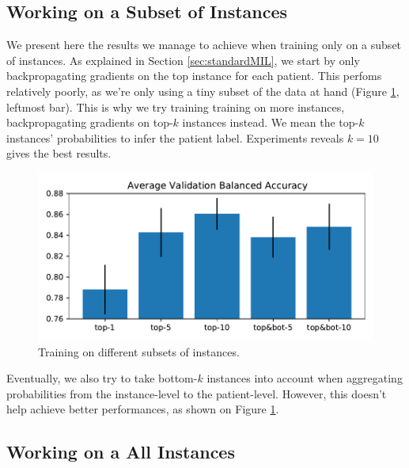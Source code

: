 \documentclass[final]{cvpr}
\begin{document}
	\subsection{Working on a Subset of Instances}
	\label{sec:topk_results}
	
	We present here the results we manage to achieve when training only on a subset of instances. As explained in Section \ref{sec:standardMIL}, we start by only backpropagating gradients on the top instance for each patient. This perfoms relatively poorly, as we're only using a tiny subset of the data at hand (Figure \ref{fig:topk_results}, leftmost bar). This is why we try training training on more instances, backpropagating gradients on top-$k$ instances instead. We mean the top-$k$ instances' probabilities to infer the patient label. Experiments reveals $k=10$ gives the best results.
	
	\begin{figure}[h]
		\begin{center}
			\includegraphics[width=0.9\linewidth]{fig/avg_bacc_topk.pdf}
		\end{center}
		\caption{Training on different subsets of instances.}
		\label{fig:topk_results}
	\end{figure}
	
	\noindent
	Eventually, we also try to take bottom-$k$ instances into account when aggregating probabilities from the instance-level to the patient-level. However, this doesn't help achieve better performances, as shown on Figure \ref{fig:topk_results}.
	
	\subsection{Working on a All Instances}
	
\end{document}
